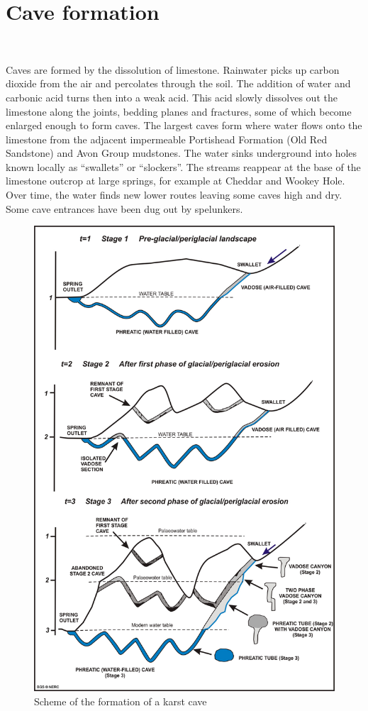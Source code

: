 \documentclass[draft, final]{report}
\begin{document}
\chapter{Cave formation}
~\par
Caves are formed by the dissolution of limestone. Rainwater picks up carbon dioxide from the air and percolates through the soil. The addition of water and carbonic acid turns then into a weak acid. This acid slowly dissolves out the limestone along the joints, bedding planes and fractures, some of which become enlarged enough to form caves. The largest caves form where water flows onto the limestone from the adjacent impermeable Portishead Formation (Old Red Sandstone) and Avon Group mudstones. The water sinks underground into holes known locally as ``swallets'' or ``slockers''. The streams reappear at the base of the limestone outcrop at large springs, for example at Cheddar and Wookey Hole. Over time, the water finds new lower routes leaving some caves high and dry. Some cave entrances have been dug out by spelunkers.
\begin{figure}[!ht]
  \centering
  \includegraphics[scale=0.4]{LateX/Images/schemekarstformation.jpg}
  \caption{Scheme of the formation of a karst cave\cite{caveformationscheme}}
\end{figure}
\clearpage
\end{document}
